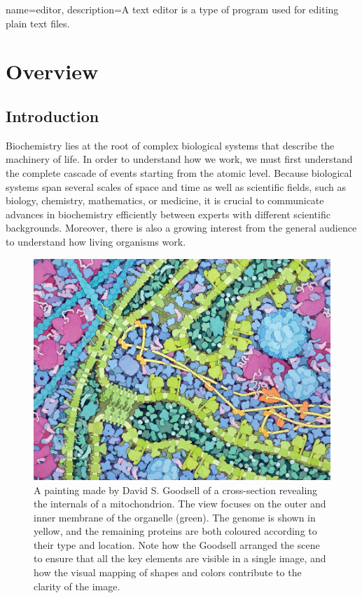 
{
	name={editor},
	description={A text editor is a type of program used for editing plain text files.}
}

\chapter{Overview}

\section{Introduction}

Biochemistry lies at the root of complex biological systems that describe the machinery of life.
In order to understand how we work, we must first understand the complete cascade of events starting from the atomic level.
Because biological systems span several scales of space and time as well as scientific fields, such as biology, chemistry, mathematics, or medicine, it is crucial to communicate advances in biochemistry efficiently between experts with different scientific backgrounds.
Moreover, there is also a growing interest from the general audience to understand how living organisms work.

\begin{figure}
	\centering
	\includegraphics[width=0.80\linewidth]{graphics/goodsell_mitochondrion}
	\caption{A painting made by David S. Goodsell of a cross-section revealing the internals of a mitochondrion. The view focuses on the outer and inner membrane of the organelle (green). The genome is shown in yellow, and the remaining proteins are both coloured according to their type and location. Note how the Goodsell arranged the scene to ensure that all the key elements are visible in a single image, and how the visual mapping of shapes and colors contribute to the clarity of the image.}
	\label{fig:david-s}
\end{figure}


